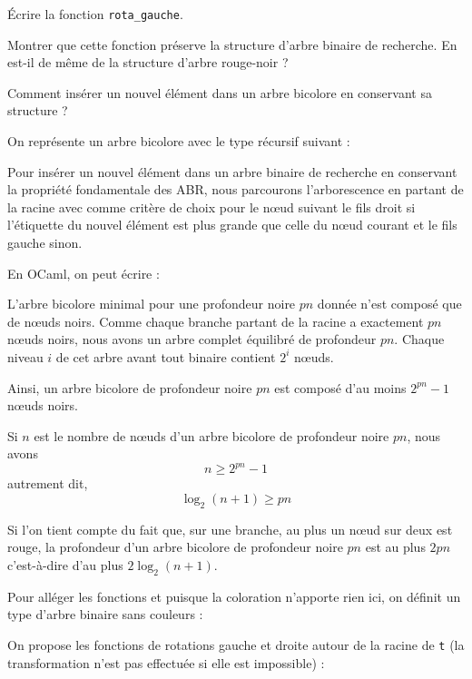 Écrire la fonction \texttt{rota\_gauche}.
\smallskip

Montrer que cette fonction préserve la structure d'arbre binaire de recherche. En est-il de même de la structure d'arbre rouge-noir ?

\Q
Comment insérer un nouvel élément dans un arbre bicolore en conservant sa structure ?

\Corrige

\Q
On représente un arbre bicolore avec le type récursif suivant :



\Q
Pour insérer un nouvel élément dans un arbre binaire de recherche en conservant la propriété fondamentale des ABR, nous parcourons l'arborescence en partant de la racine avec comme critère de choix pour le nœud suivant le fils droit si l'étiquette du nouvel élément est plus grande que celle du nœud courant et le fils gauche sinon.
\medskip

En OCaml, on peut écrire :



\Q
L'arbre bicolore minimal pour une profondeur noire $pn$ donnée n'est composé que de nœuds noirs. Comme chaque branche partant de la racine a exactement $pn$ nœuds noirs, nous avons un arbre complet équilibré de profondeur $pn$. Chaque niveau $i$ de cet arbre avant tout binaire contient $2^i$ nœuds.
\medskip

Ainsi, un arbre bicolore de profondeur noire $pn$ est composé d'au moins $2^{pn}-1$ nœuds noirs.
\medskip

Si $n$ est le nombre de nœuds d'un arbre bicolore de profondeur noire $pn$, nous avons
\[
    n \geq 2^{pn}-1
\]
autrement dit,
\[
    \log_2(n+1) \geq pn
\]

Si l'on tient compte du fait que, sur une branche, au plus un nœud sur deux est rouge, la profondeur d'un arbre bicolore de profondeur noire $pn$ est au plus $2pn$ c'est-à-dire d'au plus $2\log_2(n+1)$.

\Q
Pour alléger les fonctions et puisque la coloration n'apporte rien ici, on définit un type d'arbre binaire sans couleurs :



On propose les fonctions de rotations gauche et droite autour de la racine de \texttt{t} (la transformation n'est pas effectuée si elle est impossible) :



